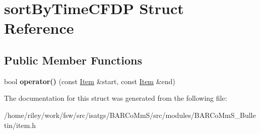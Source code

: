 \hypertarget{structsort_by_time_c_f_d_p}{}\section{sort\+By\+Time\+C\+F\+DP Struct Reference}
\label{structsort_by_time_c_f_d_p}
\subsection*{Public Member Functions}
\begin{DoxyCompactItemize}
\item 
bool {\bfseries operator()} (const \hyperlink{class_item}{Item} \&start, const \hyperlink{class_item}{Item} \&end)\hypertarget{structsort_by_time_c_f_d_p_a12a01dc63586c113d86bb673d720627b}{}\label{structsort_by_time_c_f_d_p_a12a01dc63586c113d86bb673d720627b}

\end{DoxyCompactItemize}


The documentation for this struct was generated from the following file\+:\begin{DoxyCompactItemize}
\item 
/home/riley/work/fsw/src/isatgs/\+B\+A\+R\+Co\+Mm\+S/src/modules/\+B\+A\+R\+Co\+Mm\+S\+\_\+\+Bulletin/item.\+h\end{DoxyCompactItemize}
